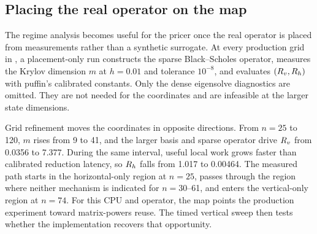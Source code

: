\subsection{Placing the real operator on the map}\label{sec:map}

The regime analysis becomes useful for the pricer once the real operator is placed from measurements rather than a synthetic surrogate. At every production grid in , a placement-only run constructs the sparse Black--Scholes operator, measures the Krylov dimension $m$ at $h=0.01$ and tolerance $10^{-8}$, and evaluates $(R_v,R_h)$ with puffin's calibrated constants. Only the dense eigensolve diagnostics are omitted. They are not needed for the coordinates and are infeasible at the larger state dimensions.

Grid refinement moves the coordinates in opposite directions. From $n=25$ to 120, $m$ rises from 9 to 41, and the larger basis and sparse operator drive $R_v$ from 0.0356 to 7.377. During the same interval, useful local work grows faster than calibrated reduction latency, so $R_h$ falls from 1.017 to 0.00464. The measured path starts in the horizontal-only region at $n=25$, passes through the region where neither mechanism is indicated for $n=30$--61, and enters the vertical-only region at $n=74$. For this CPU and operator, the map points the production experiment toward matrix-powers reuse. The timed vertical sweep then tests whether the implementation recovers that opportunity.

